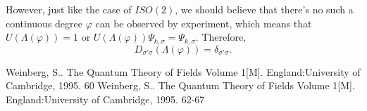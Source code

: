 \documentclass[11pt]{article}
\begin{document}
However, just like the case of $ISO \left(2\right)$, we should believe that there's no such a continuous degree $\varphi$ can be observed by experiment, which means that $U\left(\Lambda\left(\varphi\right)\right)=1$ or $U\left(\Lambda\left(\varphi\right)\right)\Psi_{k,\sigma}=\Psi_{k,\sigma}$. Therefore,
\begin{equation}
	D_{\sigma'\sigma}\left(\Lambda\left(\varphi\right)\right)=\delta_{\sigma'\sigma}.
\end{equation}
\begin{thebibliography}{99}
Weinberg, S.. The Quantum Theory of Fields Volume 1[M]. England:University of Cambridge, 1995. 60
Weinberg, S.. The Quantum Theory of Fields Volume 1[M]. England:University of Cambridge, 1995. 62-67
\end{thebibliography}
\end{document}
